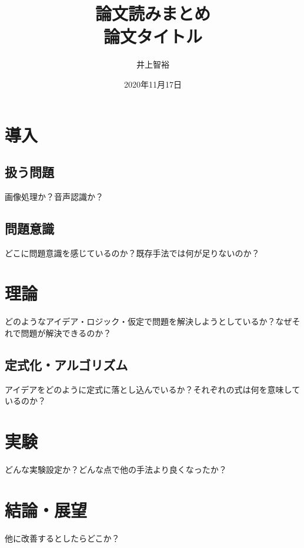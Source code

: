 \documentclass{jsarticle}
\title{\vspace{-3cm}論文読みまとめ\\論文タイトル}
\author{井上智裕}
\date{2020年11月17日}
\begin{document}
\maketitle
\vspace{-1cm}
\section{導入}
\subsection{扱う問題}
画像処理か？音声認識か？
\subsection{問題意識}
どこに問題意識を感じているのか？既存手法では何が足りないのか？

\section{理論}
どのようなアイデア・ロジック・仮定で問題を解決しようとしているか？なぜそれで問題が解決できるのか？
\subsection{定式化・アルゴリズム}
アイデアをどのように定式に落とし込んでいるか？それぞれの式は何を意味しているのか？

\section{実験}
どんな実験設定か？どんな点で他の手法より良くなったか？

\section{結論・展望}
他に改善するとしたらどこか？

\end{document}
